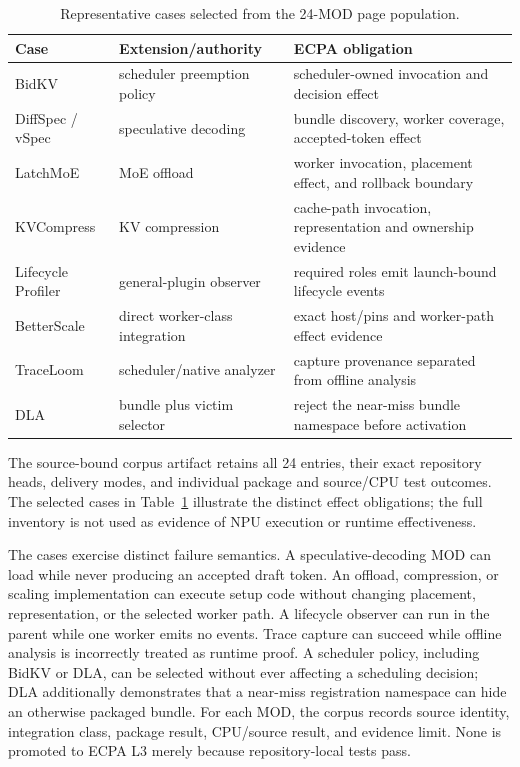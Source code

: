 \documentclass[letterpaper,twocolumn,10pt]{article}
\begin{document}
\begin{table}[t]
\centering\small
\caption{Representative cases selected from the 24-MOD page population.}
\label{tab:representative-cases}
\begin{tabularx}{\columnwidth}{@{}lXX@{}}
\toprule
Case & Extension/authority & ECPA obligation \\
\midrule
BidKV & scheduler preemption policy & scheduler-owned invocation and decision effect \\
DiffSpec / vSpec & speculative decoding & bundle discovery, worker coverage, accepted-token effect \\
LatchMoE & MoE offload & worker invocation, placement effect, and rollback boundary \\
KVCompress & KV compression & cache-path invocation, representation and ownership evidence \\
Lifecycle Profiler & general-plugin observer & required roles emit launch-bound lifecycle events \\
BetterScale & direct worker-class integration & exact host/pins and worker-path effect evidence \\
TraceLoom & scheduler/native analyzer & capture provenance separated from offline analysis \\
DLA & bundle plus victim selector & reject the near-miss bundle namespace before activation \\
\bottomrule
\end{tabularx}
\end{table}

The source-bound corpus artifact retains all 24 entries, their exact repository
heads, delivery modes, and individual package and source/CPU test outcomes.
The selected cases in Table~\ref{tab:representative-cases} illustrate the
distinct effect obligations; the full inventory is not used as evidence of
NPU execution or runtime effectiveness.

The cases exercise distinct failure semantics.  A speculative-decoding MOD can
load while never producing an accepted draft token.  An offload, compression,
or scaling implementation can execute setup code without changing placement,
representation, or the selected worker path.  A lifecycle observer can run in
the parent while one worker emits no events.  Trace capture can succeed while
offline analysis is incorrectly treated as runtime proof.  A scheduler policy,
including BidKV or DLA, can be selected without ever affecting a scheduling
decision; DLA additionally demonstrates that a near-miss registration namespace
can hide an otherwise packaged bundle.  For each MOD, the corpus records source
identity, integration class, package result, CPU/source result, and evidence
limit.  None is promoted to ECPA L3 merely because repository-local tests pass.
\end{document}

